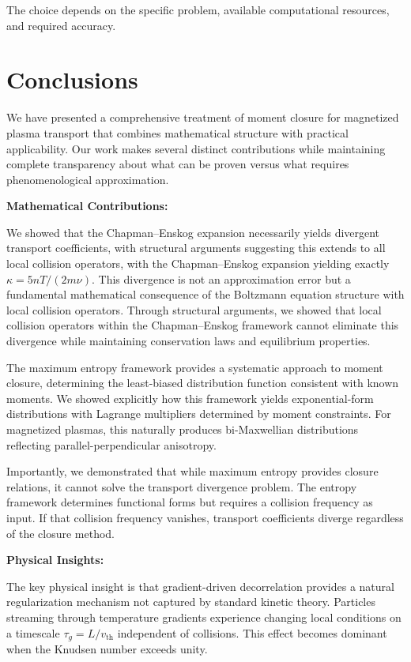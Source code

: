 \documentclass[12pt,a4paper]{article}
\begin{document}
The choice depends on the specific problem, available computational resources, and required accuracy.

\section{Conclusions}

We have presented a comprehensive treatment of moment closure for magnetized plasma transport that combines mathematical structure with practical applicability. Our work makes several distinct contributions while maintaining complete transparency about what can be proven versus what requires phenomenological approximation.

\textbf{Mathematical Contributions:}

We showed that the Chapman--Enskog expansion necessarily yields divergent transport coefficients, with structural arguments suggesting this extends to all local collision operators, with the Chapman--Enskog expansion yielding exactly $\kappa = 5nT/(2m\nu)$. This divergence is not an approximation error but a fundamental mathematical consequence of the Boltzmann equation structure with local collision operators. Through structural arguments, we showed that local collision operators within the Chapman--Enskog framework cannot eliminate this divergence while maintaining conservation laws and equilibrium properties.

The maximum entropy framework provides a systematic approach to moment closure, determining the least-biased distribution function consistent with known moments. We showed explicitly how this framework yields exponential-form distributions with Lagrange multipliers determined by moment constraints. For magnetized plasmas, this naturally produces bi-Maxwellian distributions reflecting parallel-perpendicular anisotropy.

Importantly, we demonstrated that while maximum entropy provides closure relations, it cannot solve the transport divergence problem. The entropy framework determines functional forms but requires a collision frequency as input. If that collision frequency vanishes, transport coefficients diverge regardless of the closure method.

\textbf{Physical Insights:}

The key physical insight is that gradient-driven decorrelation provides a natural regularization mechanism not captured by standard kinetic theory. Particles streaming through temperature gradients experience changing local conditions on a timescale $\tau_g = L/v_{\text{th}}$ independent of collisions. This effect becomes dominant when the Knudsen number exceeds unity.
\end{document}
